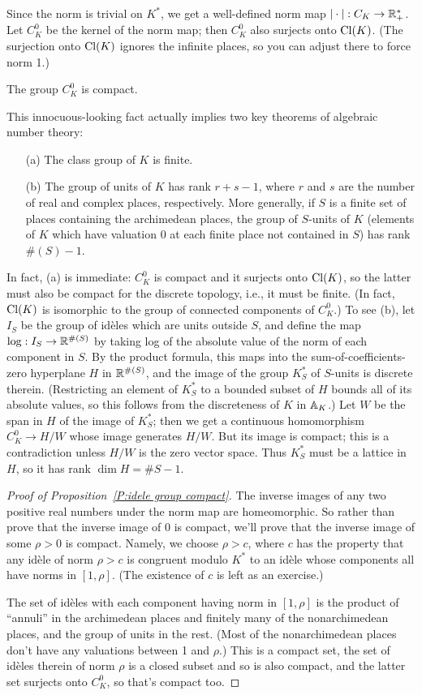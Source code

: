 Since the norm is trivial on $K^*$, we get a well-defined norm map
$|\cdot|: C_K \to \RR^*_+$. Let $C_K^0$ be the kernel of the norm map;
then $C_K^0$ also surjects onto $\Cl(K)$. (The surjection onto $\Cl(K)$ ignores
the infinite places, so you can adjust there to force norm 1.)
\begin{prop} \label{P:idele group compact}
The group $C_K^0$ is compact.
\end{prop}
This innocuous-looking fact actually implies two key theorems of algebraic number theory:
\begin{enumerate}
\item[(a)]
The class group of $K$ is finite.
\item[(b)]
The group of units of $K$ has rank $r+s-1$, where $r$ and $s$ are the number
of real and complex places, respectively. More generally, if $S$ is a finite
set of places containing the archimedean places,
the group of $S$-units of $K$ (elements of $K$ which
have valuation 0 at each finite place not contained in $S$) has rank
$\#(S)-1$.
\end{enumerate}
In fact, (a) is immediate: $C_K^0$ is compact and it surjects onto 
$\Cl(K)$, so the latter must also be compact for the discrete topology,
i.e., it must be finite. (In fact, $\Cl(K)$ is isomorphic to the group
of connected components of $C_K^0$.)
To see (b), let $I_S$ be the group of id\`eles which are units outside $S$,
and define the map $\log: I_S \to \RR^{\#(S)}$ by taking log of the absolute
value of the norm of each component in $S$. By the product formula, this maps
into the sum-of-coefficients-zero hyperplane $H$ in $\RR^{\#(S)}$, and the
image of the group $K_S^*$ of $S$-units is discrete therein. (Restricting 
an element of $K_S^*$ to a bounded subset of $H$ bounds all of its
absolute values, so this follows from the discreteness of $K$ in $\AA_K$.)
Let $W$ be the span in $H$ of the image of $K_S^*$; then
we get a continuous homomorphism $C_K^0 \to H/W$ whose image generates
$H/W$. But its image is compact; this is a contradiction unless $H/W$
is the zero vector space. Thus $K_S^*$ must be a lattice in $H$,
so it has rank $\dim H = \#S - 1$.

\begin{proof}[Proof of Proposition~\ref{P:idele group compact}]
The inverse images of any two positive real numbers under the norm map are
homeomorphic. So rather than prove that the inverse image of 0 is compact,
we'll prove that the inverse image of some $\rho > 0$ is compact.
Namely, we choose $\rho>c$, where $c$ has the property that any id\`ele of
norm $\rho > c$ is congruent modulo $K^*$ to an id\`ele whose components
all have norms in $[1, \rho]$. (The existence of $c$ is left as an exercise.)

The set
of id\`eles with each component having norm in $[1, \rho]$ is the product
of ``annuli'' in the archimedean places and finitely many of the
nonarchimedean places, and the group of units in the rest. (Most of the
nonarchimedean places don't have any valuations between 1 and $\rho$.)
This is a compact set, the set of id\`eles therein of norm $\rho$ is a closed
subset and so is also compact, and the latter set surjects onto
$C_K^0$, so that's compact too.
\end{proof}

